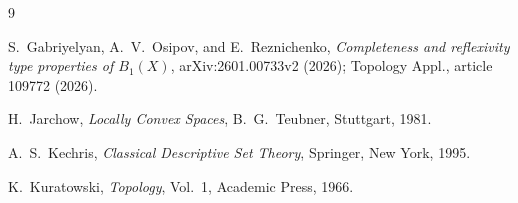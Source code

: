 \documentclass[11pt]{article}
\begin{document}
\begin{thebibliography}{9}

S.~Gabriyelyan, A.~V.~Osipov, and E.~Reznichenko,
\emph{Completeness and reflexivity type properties of $B_1(X)$},
arXiv:2601.00733v2 (2026); Topology Appl., article 109772 (2026).

H.~Jarchow,
\emph{Locally Convex Spaces},
B.~G.~Teubner, Stuttgart, 1981.

A.~S.~Kechris,
\emph{Classical Descriptive Set Theory},
Springer, New York, 1995.

K.~Kuratowski,
\emph{Topology}, Vol.~1,
Academic Press, 1966.

\end{thebibliography}
\end{document}
